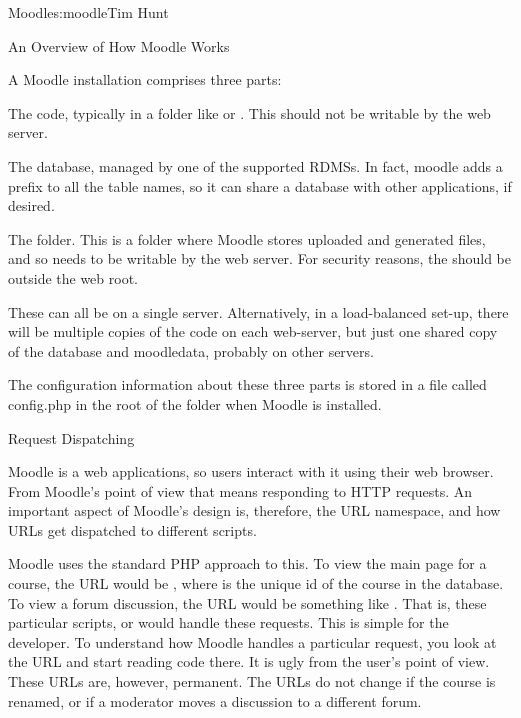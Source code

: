\begin{aosachapter}{Moodle}{s:moodle}{Tim Hunt}
\begin{aosasect1}{An Overview of How Moodle Works}

A Moodle installation comprises three parts:

\begin{aosaenumerate}

\item The code, typically in a folder like  or
  . This should not be writable
  by the web server.

\item The database, managed by one of the supported RDMSs. In fact,
  moodle adds a prefix to all the table names, so it can share a
  database with other applications, if desired.

\item The  folder. This is a folder where Moodle
  stores uploaded and generated files, and so needs to be writable by
  the web server. For security reasons, the should be outside the web
  root.

\end{aosaenumerate}

These can all be on a single server. Alternatively, in a load-balanced
set-up, there will be multiple copies of the code on each web-server,
but just one shared copy of the database and moodledata, probably on
other servers.

The configuration information about these three parts is stored in a
file called config.php in the root of the  folder when
Moodle is installed.

\begin{aosasect2}{Request Dispatching}

Moodle is a web applications, so users interact with it using their
web browser. From Moodle's point of view that means responding to HTTP
requests. An important aspect of Moodle's design is, therefore, the
URL namespace, and how URLs get dispatched to different scripts.

Moodle uses the standard PHP approach to this. To view the main page
for a course, the URL would be ,
where  is the unique id of the course in the database. To
view a forum discussion, the URL would be something like
. That is, these particular
scripts,  or  would
handle these requests. This is simple for the developer. To understand
how Moodle handles a particular request, you look at the URL and start
reading code there. It is ugly from the user's point of view. These
URLs are, however, permanent. The URLs do not change if the course is
renamed, or if a moderator moves a discussion to a different forum.


\end{aosasect2}
\end{aosasect1}
\end{aosachapter}
